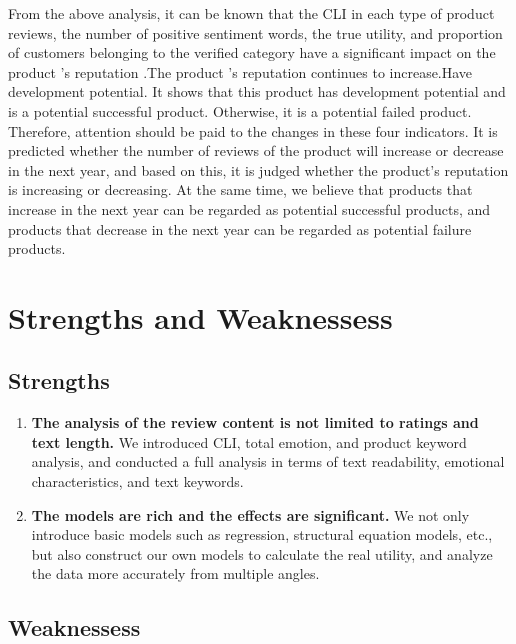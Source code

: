 \documentclass[12pt,a4paper,]{article}
\begin{document}
From the above analysis, it can be known that the CLI in each type of
product reviews, the number of positive sentiment words, the true
utility, and proportion of customers belonging to the verified category
have a significant impact on the product 's reputation .The product 's
reputation continues to increase.Have development potential. It shows
that this product has development potential and is a potential
successful product. Otherwise, it is a potential failed product.
Therefore, attention should be paid to the changes in these four
indicators. It is predicted whether the number of reviews of the product
will increase or decrease in the next year, and based on this, it is
judged whether the product's reputation is increasing or decreasing. At
the same time, we believe that products that increase in the next year
can be regarded as potential successful products, and products that
decrease in the next year can be regarded as potential failure products.

\hypertarget{strengths-and-weaknessess}{%
\section{Strengths and Weaknessess}\label{strengths-and-weaknessess}}

\hypertarget{strengths}{%
\subsection{Strengths}\label{strengths}}

\begin{enumerate}
\def\labelenumi{\arabic{enumi}.}
\item
  \textbf{The analysis of the review content is not limited to ratings
  and text length.} We introduced CLI, total emotion, and product
  keyword analysis, and conducted a full analysis in terms of text
  readability, emotional characteristics, and text keywords.
\item
  \textbf{The models are rich and the effects are significant.} We not
  only introduce basic models such as regression, structural equation
  models, etc., but also construct our own models to calculate the real
  utility, and analyze the data more accurately from multiple angles.
\end{enumerate}

\hypertarget{weaknessess}{%
\subsection{Weaknessess}\label{weaknessess}}
\end{document}
